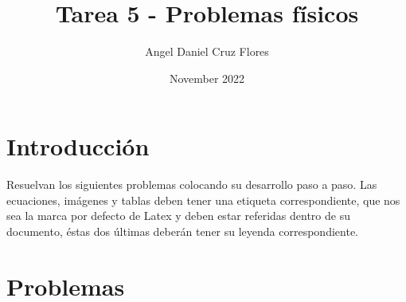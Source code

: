 \documentclass[letterpaper, 12pt]{article}
\title{Tarea 5 - Problemas físicos}
\author{Angel Daniel Cruz Flores}
\date{November 2022}
\begin{document}
\maketitle

\section{Introducción}

Resuelvan los siguientes problemas colocando su desarrollo paso a paso. Las ecuaciones, imágenes y tablas deben tener una etiqueta correspondiente, que nos sea la marca por defecto de Latex y deben estar referidas dentro de su documento, éstas dos últimas deberán tener su leyenda correspondiente.

\newpage

\section {Problemas}
\end{document}

